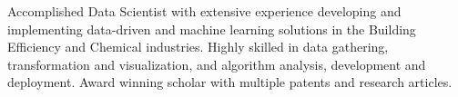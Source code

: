 

\begin{cvparagraph}

Accomplished Data Scientist with extensive experience developing and implementing data-driven and machine learning solutions in the Building Efficiency and Chemical industries. Highly skilled in data gathering, transformation and visualization, and algorithm analysis, development and deployment. Award winning scholar with multiple patents and research articles.

\end{cvparagraph}
